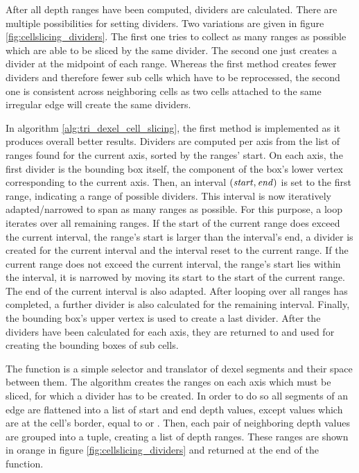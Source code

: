 After all depth ranges have been computed, dividers are calculated.
There are multiple possibilities for setting dividers.
Two variations are given in figure \ref{fig:cellslicing_dividers}.
The first one tries to collect as many ranges as possible which are able to be sliced by the same divider.
The second one just creates a divider at the midpoint of each range.
Whereas the first method creates fewer dividers and therefore fewer sub cells which have to be reprocessed, the second one is consistent across neighboring cells as two cells attached to the same irregular edge will create the same dividers.

In algorithm \ref{alg:tri_dexel_cell_slicing}, the first method is implemented as it produces overall better results.
Dividers are computed per axis from the list of ranges found for the current axis, sorted by the ranges' start.
On each axis, the first divider is the bounding box itself, \ie the component of the box's lower vertex corresponding to the current axis.
Then, an interval $(\mathit{start}, \mathit{end})$ is set to the first range, indicating a range of possible dividers.
This interval is now iteratively adapted/narrowed to span as many ranges as possible.
For this purpose, a loop iterates over all remaining ranges.
If the start of the current range does exceed the current interval, \ie the range's start is larger than the interval's end, a divider is created for the current interval and the interval reset to the current range.
If the current range does not exceed the current interval, \ie the range's start lies within the interval, it is narrowed by moving its start to the start of the current range.
The end of the current interval is also adapted.
After looping over all ranges has completed, a further divider is also calculated for the remaining interval.
Finally, the bounding box's upper vertex is used to create a last divider.
After the dividers have been calculated for each axis, they are returned to and used for creating the bounding boxes of sub cells.

The  function is a simple selector and translator of dexel segments and their space between them.
The algorithm creates the ranges on each axis which must be sliced, \ie for which a divider has to be created.
In order to do so all segments of an edge are flattened into a list of start and end depth values, except values which are at the cell's border, \ie equal to  or .
Then, each pair of neighboring depth values are grouped into a tuple, creating a list of depth ranges.
These ranges are shown in orange in figure \ref{fig:cellslicing_dividers} and returned at the end of the function.


